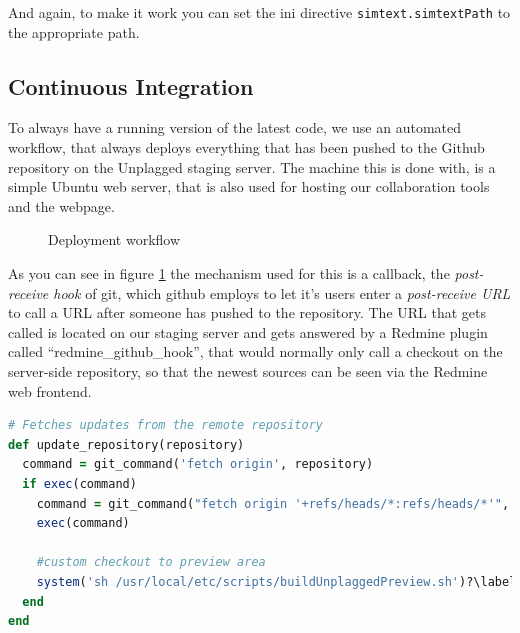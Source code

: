 And again, to make it work you can set the ini directive \texttt{simtext.simtextPath} to the appropriate path.

\subsection{Continuous Integration}\label{sec:continuousIntegration}

To always have a running version of the latest code, we use an automated workflow, that always deploys everything that 
has been pushed to the Github repository on the Unplagged staging server. The machine this is done with, is a simple 
Ubuntu web server, that is also used for hosting our collaboration tools and the webpage.

\begin{figure}[!h]
  \centering
  \caption{Deployment workflow}
  \label{fig:developmentWorkflow}
\end{figure}

As you can see in figure \ref{fig:developmentWorkflow} the mechanism used for this is a callback, the 
\textit{post-receive hook} of git, 
which github employs to let it's users enter a \textit{post-receive URL} to call a URL after someone has pushed to the
repository. The URL that gets called is located on our staging server and gets answered by a Redmine plugin called 
\enquote{redmine\_github\_hook}, that would
normally only call a checkout on the server-side repository, so that the newest sources can be seen via the Redmine
web frontend. 

\begin{lstlisting}[caption=Changes to redmine\_github\_hook.rb, label=list:redmineGithubHook, language=Ruby]
# Fetches updates from the remote repository
def update_repository(repository)
  command = git_command('fetch origin', repository)
  if exec(command)
    command = git_command("fetch origin '+refs/heads/*:refs/heads/*'", repository)
    exec(command)

    #custom checkout to preview area
    system('sh /usr/local/etc/scripts/buildUnplaggedPreview.sh')?\label{customRubyChange}?
  end
end
\end{lstlisting}

